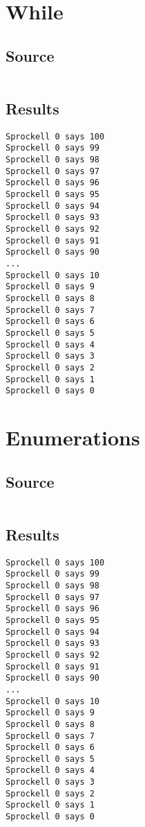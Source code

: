 \documentclass[twoside]{report}
\begin{document}
\section{While}
\subsection{Source}
\inputminted[tabsize=4,linenos,firstnumber=1]{text}{../../src/haskell/PP-project-2017/test/while.shl}
\subsection{Results}
\begin{verbatim}
Sprockell 0 says 100
Sprockell 0 says 99
Sprockell 0 says 98
Sprockell 0 says 97
Sprockell 0 says 96
Sprockell 0 says 95
Sprockell 0 says 94
Sprockell 0 says 93
Sprockell 0 says 92
Sprockell 0 says 91
Sprockell 0 says 90
...
Sprockell 0 says 10
Sprockell 0 says 9
Sprockell 0 says 8
Sprockell 0 says 7
Sprockell 0 says 6
Sprockell 0 says 5
Sprockell 0 says 4
Sprockell 0 says 3
Sprockell 0 says 2
Sprockell 0 says 1
Sprockell 0 says 0
\end{verbatim}

\section{Enumerations}
\subsection{Source}
\inputminted[tabsize=4,linenos,firstnumber=1]{text}{../../src/haskell/PP-project-2017/test/enum.shl}
\subsection{Results}
\begin{verbatim}
Sprockell 0 says 100
Sprockell 0 says 99
Sprockell 0 says 98
Sprockell 0 says 97
Sprockell 0 says 96
Sprockell 0 says 95
Sprockell 0 says 94
Sprockell 0 says 93
Sprockell 0 says 92
Sprockell 0 says 91
Sprockell 0 says 90
...
Sprockell 0 says 10
Sprockell 0 says 9
Sprockell 0 says 8
Sprockell 0 says 7
Sprockell 0 says 6
Sprockell 0 says 5
Sprockell 0 says 4
Sprockell 0 says 3
Sprockell 0 says 2
Sprockell 0 says 1
Sprockell 0 says 0
\end{verbatim}
\end{document}
